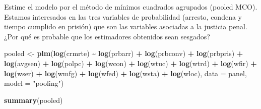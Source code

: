 \documentclass[
  12pt,
]{article}
\newenvironment{Shaded}{\begin{snugshade}}{\end{snugshade}}
\newcommand{\AttributeTok}[1]{\textcolor[rgb]{0.13,0.29,0.53}{#1}}
\newcommand{\FunctionTok}[1]{\textcolor[rgb]{0.13,0.29,0.53}{\textbf{#1}}}
\newcommand{\NormalTok}[1]{#1}
\newcommand{\OtherTok}[1]{\textcolor[rgb]{0.56,0.35,0.01}{#1}}
\newcommand{\SpecialCharTok}[1]{\textcolor[rgb]{0.81,0.36,0.00}{\textbf{#1}}}
\newcommand{\StringTok}[1]{\textcolor[rgb]{0.31,0.60,0.02}{#1}}
\begin{document}
Estime el modelo por el método de mínimos cuadrados agrupados (pooled
MCO). Estamos interesados en las tres variables de probabilidad
(arresto, condena y tiempo cumplido en prisión) que son las variables
asociadas a la justicia penal. ¿Por qué es probable que los estimadores
obtenidos sean sesgados?

\begin{Shaded}
\begin{Highlighting}[]
\NormalTok{pooled }\OtherTok{\textless{}{-}} \FunctionTok{plm}\NormalTok{(}\FunctionTok{log}\NormalTok{(crmrte) }\SpecialCharTok{\textasciitilde{}} \FunctionTok{log}\NormalTok{(prbarr) }\SpecialCharTok{+} \FunctionTok{log}\NormalTok{(prbconv) }\SpecialCharTok{+} \FunctionTok{log}\NormalTok{(prbpris) }\SpecialCharTok{+} 
                \FunctionTok{log}\NormalTok{(avgsen) }\SpecialCharTok{+} \FunctionTok{log}\NormalTok{(polpc) }\SpecialCharTok{+} \FunctionTok{log}\NormalTok{(wcon) }\SpecialCharTok{+} \FunctionTok{log}\NormalTok{(wtuc) }\SpecialCharTok{+} 
                \FunctionTok{log}\NormalTok{(wtrd) }\SpecialCharTok{+} \FunctionTok{log}\NormalTok{(wfir) }\SpecialCharTok{+} \FunctionTok{log}\NormalTok{(wser) }\SpecialCharTok{+} \FunctionTok{log}\NormalTok{(wmfg) }\SpecialCharTok{+} \FunctionTok{log}\NormalTok{(wfed) }\SpecialCharTok{+} 
                \FunctionTok{log}\NormalTok{(wsta) }\SpecialCharTok{+} \FunctionTok{log}\NormalTok{(wloc), }\AttributeTok{data =}\NormalTok{ panel, }\AttributeTok{model =} \StringTok{"pooling"}\NormalTok{)}

\FunctionTok{summary}\NormalTok{(pooled)}
\end{Highlighting}
\end{Shaded}
\end{document}
